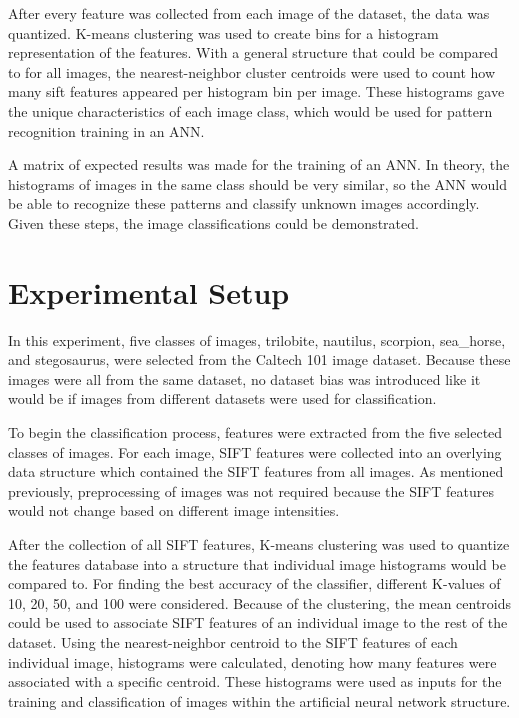 \documentclass{article}
\begin{document}
After every feature was collected from each image of the dataset, the data was quantized. K-means clustering was used to create bins for a histogram representation of the features. With a general structure that could be compared to for all images, the nearest-neighbor cluster centroids were used to count how many sift features appeared per histogram bin per image. These histograms gave the unique characteristics of each image class, which would be used for pattern recognition training in an ANN.

A matrix of expected results was made for the training of an ANN. In theory, the histograms of images in the same class should be very similar, so the ANN would be able to recognize these patterns and classify unknown images accordingly. Given these steps, the image classifications could be demonstrated.
%
\section{Experimental Setup}
\label{sec:expsetup}

In this experiment, five classes of images, trilobite, nautilus, scorpion, sea\_horse, and stegosaurus, were selected from the Caltech 101 image dataset\cite{caltech101}. Because these images were all from the same dataset, no dataset bias was introduced like it would be if images from different datasets were used for classification. 

To begin the classification process, features were extracted from the five selected classes of images. For each image, SIFT features were collected into an overlying data structure which contained the SIFT features from all images. As mentioned previously, preprocessing of images was not required because the SIFT features would not change based on different image intensities.

After the collection of all SIFT features, K-means clustering was used to quantize the features database into a structure that individual image histograms would be compared to. For finding the best accuracy of the classifier, different K-values of 10, 20, 50, and 100 were considered. Because of the clustering, the mean centroids could be used to associate SIFT features of an individual image to the rest of the dataset. Using the nearest-neighbor centroid to the SIFT features of each individual image, histograms were calculated, denoting how many features were associated with a specific centroid. These histograms were used as inputs for the training and classification of images within the artificial neural network structure.
\end{document}
